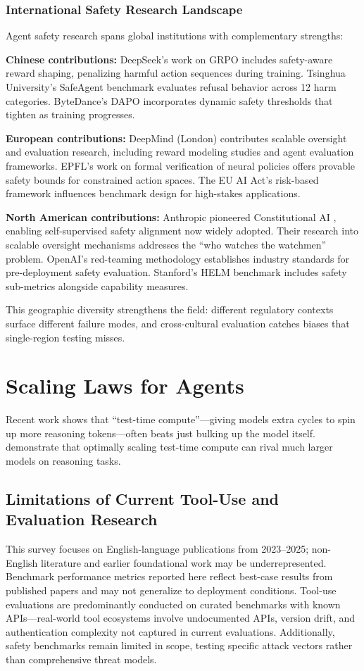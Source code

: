 \documentclass[12pt,a4paper]{report}
\theoremstyle{definition}
\begin{document}
\subsubsection{International Safety Research Landscape}

Agent safety research spans global institutions with complementary strengths:

\textbf{Chinese contributions:} DeepSeek's work on GRPO \cite{deepseek2025r1} includes safety-aware reward shaping, penalizing harmful action sequences during training. Tsinghua University's SafeAgent benchmark evaluates refusal behavior across 12 harm categories. ByteDance's DAPO \cite{bytedance2025dapo} incorporates dynamic safety thresholds that tighten as training progresses.

\textbf{European contributions:} DeepMind (London) contributes scalable oversight and evaluation research, including reward modeling studies and agent evaluation frameworks. EPFL's work on formal verification of neural policies offers provable safety bounds for constrained action spaces. The EU AI Act's risk-based framework influences benchmark design for high-stakes applications.

\textbf{North American contributions:} Anthropic pioneered Constitutional AI \cite{bai2022constitutional}, enabling self-supervised safety alignment now widely adopted. Their research into scalable oversight mechanisms addresses the ``who watches the watchmen'' problem. OpenAI's red-teaming methodology establishes industry standards for pre-deployment safety evaluation. Stanford's HELM benchmark includes safety sub-metrics alongside capability measures.

This geographic diversity strengthens the field: different regulatory contexts surface different failure modes, and cross-cultural evaluation catches biases that single-region testing misses.

\section{Scaling Laws for Agents}
Recent work shows that ``test-time compute''---giving models extra cycles to spin up more reasoning tokens---often beats just bulking up the model itself. \citet{snell2024scaling} demonstrate that optimally scaling test-time compute can rival much larger models on reasoning tasks.

\subsection{Limitations of Current Tool-Use and Evaluation Research}
This survey focuses on English-language publications from 2023--2025; non-English literature and earlier foundational work may be underrepresented. Benchmark performance metrics reported here reflect best-case results from published papers and may not generalize to deployment conditions. Tool-use evaluations are predominantly conducted on curated benchmarks with known APIs---real-world tool ecosystems involve undocumented APIs, version drift, and authentication complexity not captured in current evaluations. Additionally, safety benchmarks remain limited in scope, testing specific attack vectors rather than comprehensive threat models.
\end{document}
